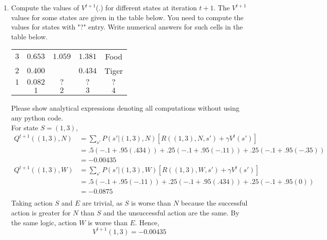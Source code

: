 \begin{enumerate}
  \item Compute the values of $V^{t+1}$(.) for different states at iteration $t+1$. The $V^{t+1}$ values for some states are given in the table below. You need to compute the values for states with "?" entry. Write numerical answers for such cells in the table below.
        \begin{center}
          \bgroup
          \def\arraystretch{1.5}%
          \begin{tabular}{|c|c|c|c|c|}
            \hline
            $3$ & $0.653$ & $1.059$              & $1.381$ & Food  \\
            $2$ & $0.400$ & \cellcolor[gray]{.1} & $0.434$ & Tiger \\
            $1$ & $0.082$ & $?$                  & $?$     & $?$   \\
            \hline
                & $1$     & $2$                  & $3$     & $4$   \\
            \hline
          \end{tabular}
          \egroup
        \end{center}
        Please show analytical expressions denoting all computations without using any python code.\\[10pt]
        For state $S=(1,3)$,
        \begin{align*}
          Q^{t+1}((1,3), N) & =\sum_{s'}P(s'\vert (1,3), N)[R((1,3), N, s') + \gamma V^t(s')]    \\
                            & =.5(-.1 + .95(.434)) + .25(-.1 + .95(-.11)) + .25(-.1 + .95(-.35)) \\
                            & = -0.00435                                                         \\
          Q^{t+1}((1,3), W) & =\sum_{s'}P(s'\vert (1,3), W)[R((1,3), W, s') + \gamma V^t(s')]    \\
                            & =.5(-.1 + .95(-.11)) + .25(-.1 + .95(.434)) + .25(-.1 + .95(0))    \\
                            & = -0.0875                                                          \\
        \end{align*}
        Taking action $S$ and $E$ are trivial, as $S$ is worse than $N$ because the successful action is greater for $N$ than $S$ and the unsuccessful action are the same. By the same logic, action $W$ is worse than $E$. Hence,
        $$
          V^{t+1}(1,3)= -0.00435
$$
\end{enumerate}
